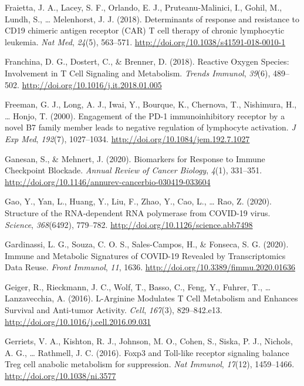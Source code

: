 \documentclass[12pt,twoside,openany,\mydriver]{thesis}  %
\begin{document}
\leavevmode\hypertarget{ref-fraietta_determinants_2018}{}%
Fraietta, J. A., Lacey, S. F., Orlando, E. J., Pruteanu-Malinici, I., Gohil, M., Lundh, S., \ldots{} Melenhorst, J. J. (2018). Determinants of response and resistance to CD19 chimeric antigen receptor (CAR) T cell therapy of chronic lymphocytic leukemia. \emph{Nat Med}, \emph{24}(5), 563--571. \url{http://doi.org/10.1038/s41591-018-0010-1}

\leavevmode\hypertarget{ref-franchina_reactive_2018}{}%
Franchina, D. G., Dostert, C., \& Brenner, D. (2018). Reactive Oxygen Species: Involvement in T Cell Signaling and Metabolism. \emph{Trends Immunol}, \emph{39}(6), 489--502. \url{http://doi.org/10.1016/j.it.2018.01.005}

\leavevmode\hypertarget{ref-freeman_engagement_2000}{}%
Freeman, G. J., Long, A. J., Iwai, Y., Bourque, K., Chernova, T., Nishimura, H., \ldots{} Honjo, T. (2000). Engagement of the PD-1 immunoinhibitory receptor by a novel B7 family member leads to negative regulation of lymphocyte activation. \emph{J Exp Med}, \emph{192}(7), 1027--1034. \url{http://doi.org/10.1084/jem.192.7.1027}

\leavevmode\hypertarget{ref-ganesan_biomarkers_2020}{}%
Ganesan, S., \& Mehnert, J. (2020). Biomarkers for Response to Immune Checkpoint Blockade. \emph{Annual Review of Cancer Biology}, \emph{4}(1), 331--351. \url{http://doi.org/10.1146/annurev-cancerbio-030419-033604}

\leavevmode\hypertarget{ref-gao_structure_2020}{}%
Gao, Y., Yan, L., Huang, Y., Liu, F., Zhao, Y., Cao, L., \ldots{} Rao, Z. (2020). Structure of the RNA-dependent RNA polymerase from COVID-19 virus. \emph{Science}, \emph{368}(6492), 779--782. \url{http://doi.org/10.1126/science.abb7498}

\leavevmode\hypertarget{ref-gardinassi_immune_2020}{}%
Gardinassi, L. G., Souza, C. O. S., Sales-Campos, H., \& Fonseca, S. G. (2020). Immune and Metabolic Signatures of COVID-19 Revealed by Transcriptomics Data Reuse. \emph{Front Immunol}, \emph{11}, 1636. \url{http://doi.org/10.3389/fimmu.2020.01636}

\leavevmode\hypertarget{ref-geiger_l-arginine_2016}{}%
Geiger, R., Rieckmann, J. C., Wolf, T., Basso, C., Feng, Y., Fuhrer, T., \ldots{} Lanzavecchia, A. (2016). L-Arginine Modulates T Cell Metabolism and Enhances Survival and Anti-tumor Activity. \emph{Cell}, \emph{167}(3), 829--842.e13. \url{http://doi.org/10.1016/j.cell.2016.09.031}

\leavevmode\hypertarget{ref-gerriets_foxp3_2016}{}%
Gerriets, V. A., Kishton, R. J., Johnson, M. O., Cohen, S., Siska, P. J., Nichols, A. G., \ldots{} Rathmell, J. C. (2016). Foxp3 and Toll-like receptor signaling balance Treg cell anabolic metabolism for suppression. \emph{Nat Immunol}, \emph{17}(12), 1459--1466. \url{http://doi.org/10.1038/ni.3577}
\end{document}
